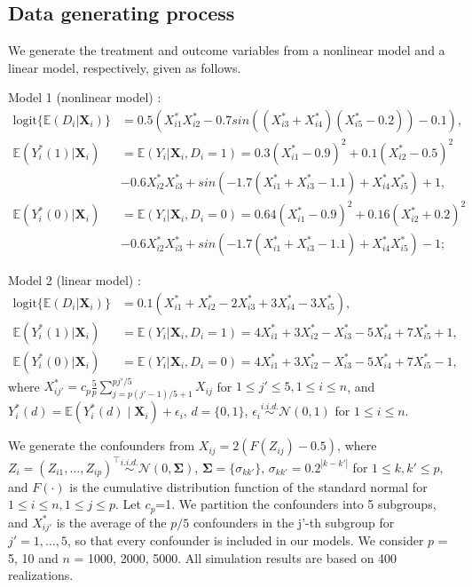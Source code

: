 \documentclass[11pt]{article}
\def\bs{\boldsymbol}
\numberwithin{equation}{section}
\begin{document}
\subsection{Data generating process}\label{subsec:simu_models} We generate the treatment and outcome variables from a nonlinear model and a linear model, respectively, given as follows.

Model 1 (nonlinear model) :
\begin{align*}
	\text{logit} \{\mathbb{E}(D_i|\boldsymbol{X}_i) \}&=0.5(X_{i1}^*X_{i2}^*-0.7sin((X_{i3}^*+X_{i4}^*)(X_{i5}^*-0.2))-0.1),\\
	\mathbb{E}(Y_i^*(1)|\bs{X}_i)&=\mathbb{E}(Y_i|\bs{X}_i, D_i=1)= 0.3(X_{i1}^*-0.9)^2+0.1(X_{i2}^*-0.5)^2\\&-0.6X_{i2}^*X_{i3}^*+sin(-1.7(X_{i1}^*+X_{i3}^*-1.1)+X_{i4}^*X_{i5}^*)+1,\\
	\mathbb{E}(Y_i^*(0)|\bs{X}_i)&=\mathbb{E}(Y_i|\bs{X}_i, D_i=0)= 0.64(X_{i1}^*-0.9)^2+0.16(X_{i2}^*+0.2)^2\\&-0.6X_{i2}^*X_{i3}^*+sin(-1.7(X_{i1}^*+X_{i3}^*-1.1)+X_{i4}^*X_{i5}^*)-1;
\end{align*}


Model 2 (linear model) :
\begin{align*}
	\text{logit} \{ \mathbb{E}(D_i|\bs{X}_i) \}&=0.1(X_{i1}^*+X_{i2}^*-2X_{i3}^*+3X_{i4}^*-3X_{i5}^*),\\
	\mathbb{E}(Y^*_i(1)|\bs{X}_i)&=\mathbb{E}(Y_i|\bs{X}_i,D_i=1)= 4X_{i1}^*+3X_{i2}^*-X_{i3}^*-5X_{i4}^*+7X_{i5}^*+1,\\
	\mathbb{E}(Y^*_i(0)|\bs{X}_i)&=\mathbb{E}(Y_i|\bs{X}_i,D_i=0)= 4X_{i1}^*+3X_{i2}^*-X_{i3}^*-5X_{i4}^*+7X_{i5}^*-1,
\end{align*}
where $X^*_{ij'} = c_p\frac{5}{p}\sum_{j=p(j'-1)/5+1}^{pj'/5}X_{ij}$ for $1\leq j' \leq 5, 1\leq i \leq n$, and $Y^*_{i}(d)=\mathbb{E}(Y^*_{i}(d)\mid  \bs{X}_{i})+\epsilon _{i}$, $d=\{0,1\}$,  $\epsilon _{i} \stackrel{i.i.d.}{\sim} \mathcal{N}\left( 0, 1 \right)$ for $1\leq i \leq n$.

We generate the confounders from $X_{ij} = 2(F(Z_{ij})-0.5)$, where $Z_{i}=(Z_{i1}, ...,Z_{ip})^\top \stackrel{i.i.d.}{\sim} \mathcal{N}\left( 0, \mathbf{\Sigma} \right)$, $\mathbf{\Sigma} = \{\sigma_{kk'} \}$, ${\sigma_{kk'}=0.2^{|k-k'|}}$ for $1\leq k, k' \leq p$, and $F(\cdot)$ is the cumulative distribution function of the standard normal for $1\leq i \leq n, 1\leq j \leq p$. Let $c_p$=1. We partition the confounders into 5 subgroups, and $X^*_{ij'}$ is the average of the $p/5$ confounders in the j'-th subgroup for $j'=1, ...,5$, so that every confounder is included in our models. We consider $p$ = 5, 10 and $n$ = 1000, 2000, 5000. All simulation results are based on 400 realizations.
\end{document}
